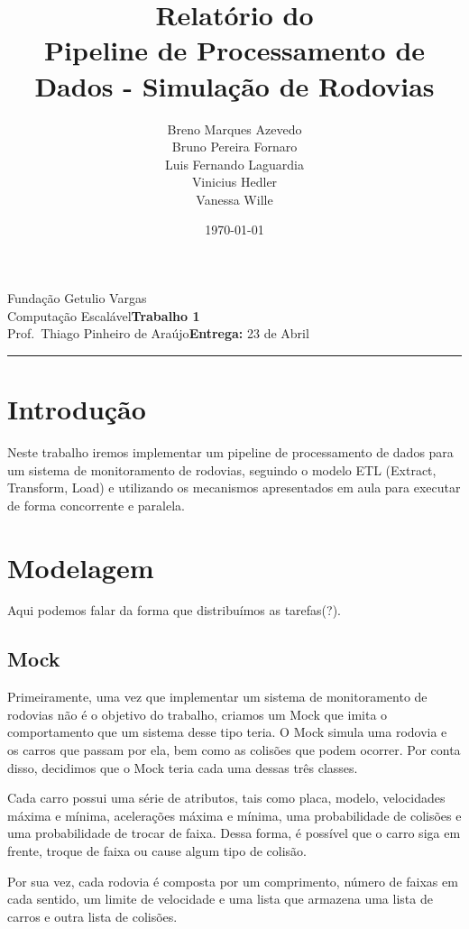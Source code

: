 \documentclass{article}
\title{
    Relatório do \assignment \\
    Pipeline de Processamento de Dados - Simulação de Rodovias
}
\author{
    Breno Marques Azevedo \\
    Bruno Pereira Fornaro \\
    Luis Fernando Laguardia \\
    Vinicius Hedler \\
    Vanessa Wille 
}
\date{\today}
\newcommand{\assignment}{Trabalho 1}
\newcommand{\duedate}{23 de Abril}
\begin{document}
    \noindent
    Fundação Getulio Vargas\hfill\\
    Computação Escalável\hfill\textbf{\assignment}\\
    Prof.\ Thiago Pinheiro de Araújo\hfill\textbf{Entrega:} \duedate\\
    \smallskip\hrule\bigskip

    {\let\newpage\relax\maketitle}
    \maketitle

    \section{Introdução}
    Neste trabalho iremos implementar um pipeline de processamento de dados
    para um sistema de monitoramento de rodovias, seguindo o modelo ETL 
    (Extract, Transform, Load) e utilizando os mecanismos apresentados
    em aula para executar de forma concorrente e paralela.

    \section{Modelagem}
    Aqui podemos falar da forma que distribuímos as tarefas(?).

    \subsection*{Mock}
    Primeiramente, uma vez que implementar um sistema de monitoramento de rodovias
    não é o objetivo do trabalho, criamos um Mock que imita o comportamento que um sistema desse tipo teria.
    O Mock simula uma rodovia e os carros que passam por ela, bem como as colisões que podem ocorrer.
    Por conta disso, decidimos que o Mock teria cada uma dessas três classes.
    
    Cada carro possui uma série de atributos, tais como placa, modelo, velocidades máxima e mínima, 
    acelerações máxima e mínima, uma probabilidade de colisões e uma probabilidade de trocar de faixa.
    Dessa forma, é possível que o carro siga em frente, troque de faixa ou cause algum tipo de colisão.

    Por sua vez, cada rodovia é composta por um comprimento, número de faixas em cada sentido,
    um limite de velocidade e uma lista que armazena uma lista de carros e outra lista de colisões.
\end{document}
